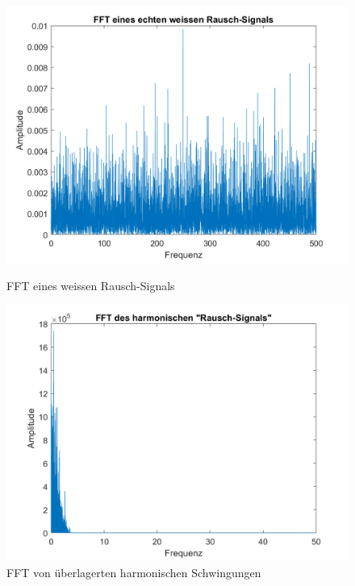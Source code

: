 \begin{figure}
	\begin{minipage}{0.45\textwidth}
		\centering
		\includegraphics[width=\linewidth]{papers/brown/images/FFTweissesRauschen.png}
		\caption{FFT eines weissen Rausch-Signals}
		\label{FFTweissesRauschen}
	\end{minipage}
	\hspace{0.05\linewidth}
	\begin{minipage}{0.45\textwidth}
		\centering
		\includegraphics[width=\linewidth]{papers/brown/images/FFT-ueberlagerteSchwingungen.png}
		\caption{FFT von überlagerten harmonischen Schwingungen}
		\label{FFTüberlagerteSchwingungen}
	\end{minipage}
\end{figure}


